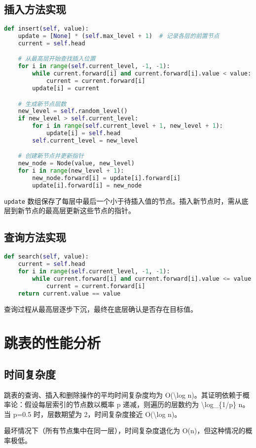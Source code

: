 \section{插入方法实现}
\begin{lstlisting}[language=python]
def insert(self, value):  
    update = [None] * (self.max_level + 1)  # 记录各层的前置节点  
    current = self.head  

    # 从最高层开始查找插入位置  
    for i in range(self.current_level, -1, -1):  
        while current.forward[i] and current.forward[i].value < value:  
            current = current.forward[i]  
        update[i] = current  

    # 生成新节点层数  
    new_level = self.random_level()  
    if new_level > self.current_level:  
        for i in range(self.current_level + 1, new_level + 1):  
            update[i] = self.head  
        self.current_level = new_level  

    # 创建新节点并更新指针  
    new_node = Node(value, new_level)  
    for i in range(new_level + 1):  
        new_node.forward[i] = update[i].forward[i]  
        update[i].forward[i] = new_node  
\end{lstlisting}
\texttt{update} 数组保存了每层中最后一个小于待插入值的节点。插入新节点时，需从底层到新节点的最高层更新这些节点的指针。\par
\section{查询方法实现}
\begin{lstlisting}[language=python]
def search(self, value):  
    current = self.head  
    for i in range(self.current_level, -1, -1):  
        while current.forward[i] and current.forward[i].value <= value:  
            current = current.forward[i]  
    return current.value == value  
\end{lstlisting}
查询过程从最高层逐步下沉，最终在底层确认是否存在目标值。\par
\chapter{跳表的性能分析}
\section{时间复杂度}
跳表的查询、插入和删除操作的平均时间复杂度均为 O(\textbackslash{}log n)。其证明依赖于概率论：假设每层索引的节点数以概率 p 递减，则遍历的层数约为 \textbackslash{}log\_{}\{{}1/p\}{} n。当 p=0.5 时，层数期望为 2，时间复杂度接近 O(\textbackslash{}log n)。\par
最坏情况下（所有节点集中在同一层），时间复杂度退化为 O(n)，但这种情况的概率极低。\par
